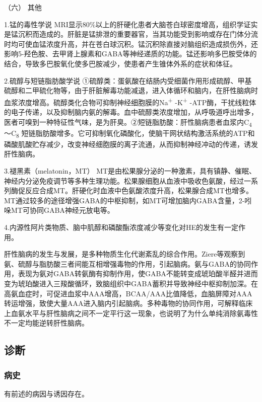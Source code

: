 \hypertarget{text00101.htmlux5cux23CHP4-3-4-2-6}{}
（六） 其他

1.锰的毒性学说
MRI显示80\%以上的肝硬化患者大脑苍白球密度增高，组织学证实是锰沉积而造成的。肝脏是锰排泄的重要器官，当其功能受到影响或存在门体分流时均可使血锰浓度升高，并在苍白球沉积。锰沉积除直接对脑组织造成损伤外，还影响5-羟色胺、去甲肾上腺素和GABA等神经递质的功能。锰还影响多巴胺受体的结合，导致多巴胺氧化使多巴胺减少，使患者产生锥体外系的症状和体征。

2.硫醇与短链脂肪酸学说
①硫醇类：蛋氨酸在结肠内受细菌作用形成硫醇、甲基硫醇和二甲硫化物等，由于肝脏解毒功能减退，进入体循环和脑内，在肝性脑病时血浆浓度增高。硫醇类化合物可抑制神经细胞膜的Na\textsuperscript{+}
-K\textsuperscript{+}
-ATP酶，干扰线粒体的电子传递，以及抑制脑内氨的解毒。血中硫醇类浓度增加，从呼吸道呼出增多，医者可嗅到一种特征性气味，是为肝臭。②短链脂肪酸：肝性脑病患者血浆内C\textsubscript{4}
～C\textsubscript{8}
短链脂肪酸增多。它可抑制氧化磷酸化，使脑干网状结构激活系统的ATP和磷酸肌酸贮存减少，改变神经细胞膜的离子流通，从而抑制神经冲动的传递，诱发肝性脑病。

3.褪黑素（melatonin，MT）
MT是由松果腺分泌的一种激素，具有镇静、催眠、神经内分泌免疫调节等多种生理功能。松果腺细胞从血液中吸收色氨酸，经过一系列酶促反应合成MT。肝硬化时血液中色氨酸浓度升高，松果腺合成MT也增多。MT通过较多的途径增强GABA的中枢抑制，如MT可增加脑内GABA含量，2-吲哚MT可协同GABA神经元放电等。

4.内源性阿片类物质、脑中肌醇和磷酸酯浓度减少等变化对HE的发生有一定作用。

肝性脑病的发生与发展，是多种物质生化代谢紊乱的综合作用。Ziere等观察到氨、硫醇与脂肪酸三者间能互相增强毒物的作用，引起脑病。氨与GABA的协同作用，表现为氨对GABA转氨酶有抑制作用，使GABA不能转变成琥珀酸半醛并进而变为琥珀酸进入三羧酸循环，致脑组织中GABA蓄积并导致神经中枢抑制加深。在高氨血症时，可促进血浆中AAA增高，BCAA/AAA比值降低，血脑屏障对AAA转运增强，致使大量AAA进入脑内引起脑病。多种毒物的协同作用，可解释临床上血氨水平与肝性脑病之间不一定平行这一现象，也说明了为什么单纯消除氨毒性不一定均能逆转肝性脑病。

\subsection{诊断}

\subsubsection{病史}

有前述的病因与诱因存在。

